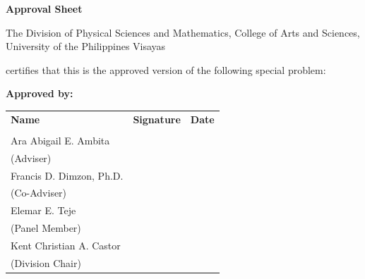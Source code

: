 \begin{center}
\textbf{Approval Sheet}

The Division of Physical Sciences and Mathematics, College of Arts and Sciences, University of the Philippines Visayas

certifies that this is the approved version of the following special problem:

\end{center}

{\small\textbf{Approved by:}}

\begin{tabular}{lll}
\bfseries Name & \bfseries Signature & \bfseries Date\\ \\
Ara Abigail E. Ambita & \signaturerule & \signaturerule\\
\multicolumn{1}{l}{(Adviser)}\\
Francis D. Dimzon, Ph.D.& \signaturerule & \signaturerule\\
\multicolumn{1}{l}{(Co-Adviser)}\\
Elemar E. Teje & \signaturerule & \signaturerule\\
\multicolumn{1}{l}{(Panel Member)}\\
Kent Christian A. Castor & \signaturerule & \signaturerule\\
\multicolumn{1}{l}{(Division Chair)}
\end{tabular}